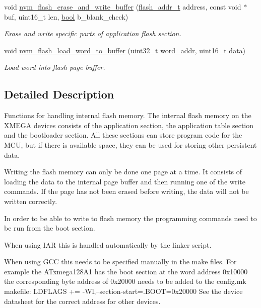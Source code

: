 \begin{DoxyCompactItemize}
void \hyperlink{group__nvm__flash__group_ga05906a0e64d2527fe92511c364548ebc}{nvm\-\_\-flash\-\_\-erase\-\_\-and\-\_\-write\-\_\-buffer} (\hyperlink{group__nvm__flash__group_ga95a069fc064dc9cd089b7d9047b909b0}{flash\-\_\-addr\-\_\-t} address, const void $\ast$buf, uint16\-\_\-t len, \hyperlink{group__group__xmega__utils_ga97a80ca1602ebf2303258971a2c938e2}{bool} b\-\_\-blank\-\_\-check)
\begin{DoxyCompactList}\small\item\em Erase and write specific parts of application flash section. \end{DoxyCompactList}\item 
void \hyperlink{group__nvm__flash__group_ga56f341c1aef558bd9b6504f5a6a95ef2}{nvm\-\_\-flash\-\_\-load\-\_\-word\-\_\-to\-\_\-buffer} (uint32\-\_\-t word\-\_\-addr, uint16\-\_\-t data)
\begin{DoxyCompactList}\small\item\em Load word into flash page buffer. \end{DoxyCompactList}\end{DoxyCompactItemize}


\subsection{Detailed Description}
Functions for handling internal flash memory. The internal flash memory on the X\-M\-E\-G\-A devices consists of the application section, the application table section and the bootloader section. All these sections can store program code for the M\-C\-U, but if there is available space, they can be used for storing other persistent data.

Writing the flash memory can only be done one page at a time. It consists of loading the data to the internal page buffer and then running one of the write commands. If the page has not been erased before writing, the data will not be written correctly.

In order to be able to write to flash memory the programming commands need to be run from the boot section.
\begin{DoxyItemize}
\item When using I\-A\-R this is handled automatically by the linker script.
\item When using G\-C\-C this needs to be specified manually in the make files. For example the A\-Txmega128\-A1 has the boot section at the word address 0x10000 the corresponding byte address of 0x20000 needs to be added to the config.\-mk makefile\-: L\-D\-F\-L\-A\-G\-S += -\/\-Wl,--section-\/start=.B\-O\-O\-T=0x20000 See the device datasheet for the correct address for other devices.
\end{DoxyItemize}

